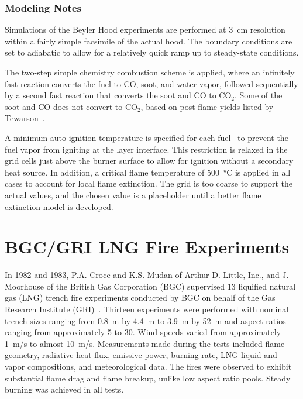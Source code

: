 \subsubsection{Modeling Notes}

Simulations of the Beyler Hood experiments are performed at 3~cm resolution within a fairly simple facsimile of the actual hood. The boundary conditions are set to adiabatic to allow for a relatively quick ramp up to steady-state conditions.

The two-step simple chemistry combustion scheme is applied, where an infinitely fast reaction converts the fuel to CO, soot, and water vapor, followed sequentially by a second fast reaction that converts the soot and CO to CO$_2$. Some of the soot and CO does not convert to CO$_2$, based on post-flame yields listed by Tewarson~\cite{SFPE:Tewarson}.

A minimum auto-ignition temperature is specified for each fuel~\cite{SFPE:Beyler} to prevent the fuel vapor from igniting at the layer interface. This restriction is relaxed in the grid cells just above the burner surface to allow for ignition without a secondary heat source. In addition, a critical flame temperature of 500~\unit{\degreeCelsius} is applied in all cases to account for local flame extinction. The grid is too coarse to support the actual values, and the chosen value is a placeholder until a better flame extinction model is developed.

\section{BGC/GRI LNG Fire Experiments}
\label{BGC_GRI_LNG_Fires_Description}

In 1982 and 1983, P.A. Croce and K.S. Mudan of Arthur D. Little, Inc., and J. Moorhouse of the British Gas Corporation (BGC) supervised 13 liquified natural gas (LNG) trench fire experiments conducted by BGC on behalf of the Gas Research Institute (GRI)~\cite{Croce:GRI}. Thirteen experiments were performed with nominal trench sizes ranging from 0.8~m by 4.4~m to 3.9~m by 52~m and aspect ratios ranging from approximately 5 to 30. Wind speeds varied from approximately 1~m/s to almost 10~m/s. Measurements made during the tests included flame geometry, radiative heat flux, emissive power, burning rate, LNG liquid and vapor compositions, and meteorological data. The fires were observed to exhibit substantial flame drag and flame breakup, unlike low aspect ratio pools. Steady burning was achieved in all tests.

